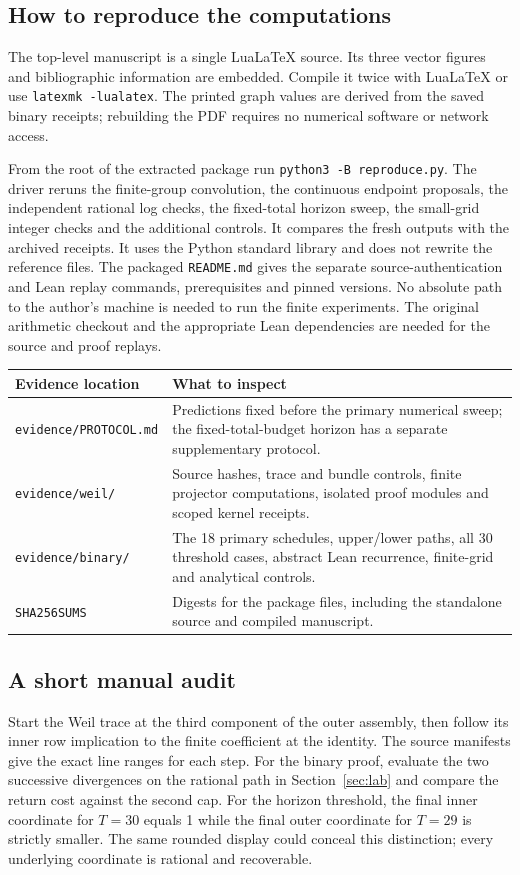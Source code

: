 \documentclass[12pt,letterpaper]{article}
\begin{document}
\subsection{How to reproduce the computations}
The top-level manuscript is a single LuaLaTeX source. Its three vector figures and bibliographic information are embedded. Compile it twice with LuaLaTeX or use \texttt{latexmk -lualatex}. The printed graph values are derived from the saved binary receipts; rebuilding the PDF requires no numerical software or network access.

From the root of the extracted package run \texttt{python3 -B reproduce.py}. The driver reruns the finite-group convolution, the continuous endpoint proposals, the independent rational log checks, the fixed-total horizon sweep, the small-grid integer checks and the additional controls. It compares the fresh outputs with the archived receipts. It uses the Python standard library and does not rewrite the reference files. The packaged \texttt{README.md} gives the separate source-authentication and Lean replay commands, prerequisites and pinned versions. No absolute path to the author's machine is needed to run the finite experiments. The original arithmetic checkout and the appropriate Lean dependencies are needed for the source and proof replays.

\begin{center}\small
\begin{tabularx}{\linewidth}{@{}p{.28\linewidth}Y@{}}
\toprule
Evidence location & What to inspect\\\midrule
\texttt{evidence/PROTOCOL.md} & Predictions fixed before the primary numerical sweep; the fixed-total-budget horizon has a separate supplementary protocol.\\
\texttt{evidence/weil/} & Source hashes, trace and bundle controls, finite projector computations, isolated proof modules and scoped kernel receipts.\\
\texttt{evidence/binary/} & The 18 primary schedules, upper/lower paths, all 30 threshold cases, abstract Lean recurrence, finite-grid and analytical controls.\\
\texttt{SHA256SUMS} & Digests for the package files, including the standalone source and compiled manuscript.\\
\bottomrule\end{tabularx}
\end{center}

\subsection{A short manual audit}
Start the Weil trace at the third component of the outer assembly, then follow its inner row implication to the finite coefficient at the identity. The source manifests give the exact line ranges for each step. For the binary proof, evaluate the two successive divergences on the rational path in Section~\ref{sec:lab} and compare the return cost against the second cap. For the horizon threshold, the final inner coordinate for \(T=30\) equals 1 while the final outer coordinate for \(T=29\) is strictly smaller. The same rounded display could conceal this distinction; every underlying coordinate is rational and recoverable.
\end{document}
